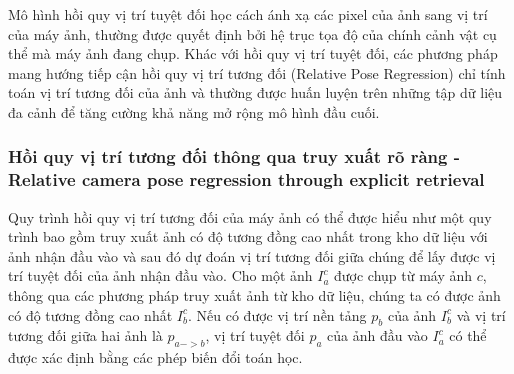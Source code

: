 Mô hình hồi quy vị trí tuyệt đối học cách ánh xạ các pixel của ảnh sang vị trí của máy ảnh, thường được quyết định bởi hệ trục tọa độ của chính cảnh vật cụ thể mà máy ảnh đang chụp. Khác với hồi quy vị trí tuyệt đối, các phương pháp mang hướng tiếp cận hồi quy vị trí tương đối (Relative Pose Regression) chỉ tính toán vị trí tương đối của ảnh và thường được huấn luyện trên những tập dữ liệu đa cảnh để tăng cường khả năng mở rộng mô hình đầu cuối.

\subsubsection*{Hồi quy vị trí tương đối thông qua truy xuất rõ ràng - Relative camera pose regression through explicit retrieval}
Quy trình hồi quy vị trí tương đối của máy ảnh có thể được hiểu như một quy trình bao gồm truy xuất ảnh có độ tương đồng cao nhất trong kho dữ liệu với ảnh nhận đầu vào và sau đó dự đoán vị trí tương đối giữa chúng để lấy được vị trí tuyệt đối của ảnh nhận đầu vào. Cho một ảnh $I_a^c$ được chụp từ máy ảnh $c$, thông qua các phương pháp truy xuất ảnh từ kho dữ liệu, chúng ta có được ảnh có độ tương đồng cao nhất $I_b^c$. Nếu có được vị trí nền tảng $p_b$ của ảnh $I_b^c$ và vị trí tương đối giữa hai ảnh là $p_{a->b}$, vị trí tuyệt đối $p_a$ của ảnh đầu vào $I_a^c$ có thể được xác định bằng các phép biến đổi toán học.

